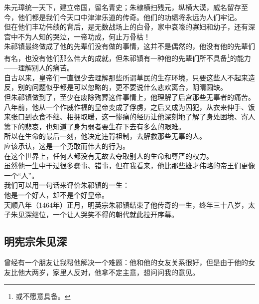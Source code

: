 \begin{multicols}{\theparacolNo}
朱元璋统一天下，建立帝国，留名青史；朱棣横扫残元，纵横大漠，威名留存至今，他们都是我们今天口中津津乐道的传奇。他们的功绩将永远为人们牢记。\\

但在他们丰功伟绩的背后，是无数战场上的白骨，家中哀嚎的寡妇和幼子，还有深宫中不为人知的哭泣，一帝功成，何止万骨枯！\\

朱祁镇最终做成了他的先辈们没有做的事情，这并不是偶然的，他没有他的先辈们有名，也没有他们那么伟大的成就，但朱祁镇有一种他的先辈们所不具备\footnote{或不愿意具备。}的能力——理解别人的痛苦。\\

自古以来，皇帝们一直很少去理解那些所谓草民的生存环境，只要这些人不起来造反，别的问题似乎都是可以忽略的，更不要说什么悲欢离合，阴晴圆缺。\\

但朱祁镇做到了，至少在废除殉葬这件事情上，他理解了后宫那些无辜者的痛苦。八年前，他从一个作威作福的皇帝变成了俘虏，之后又成为囚犯，从衣来伸手、饭来张口到衣食不继、相拥取暖，这一惨痛的经历让他深刻地了解了身处困境、寄人篱下的悲哀，也知道了身为弱者要生存下去有多么的艰难。\\

所以在生命的最后一刻，他决定违背祖制，去解救那些无辜的人。\\

应该承认，这是一个勇敢而伟大的行为。\\

在这个世界上，任何人都没有无故去夺取别人的生命和尊严的权力。\\

虽然他一生中干过很多蠢事、错事，但在我看来，他比那些雄才伟略的帝王们更像一个“人”。\\

我们可以用一句话来评价朱祁镇的一生：\\

他是一个好人，却不是个好皇帝。\\

天顺八年（1464年）正月，明英宗朱祁镇结束了他传奇的一生，终年三十八岁，太子朱见深继位，一个让人哭笑不得的朝代就此拉开序幕。\\

\subsection{明宪宗朱见深}
曾经有一个朋友让我帮他解决一个难题：他和他的女友关系很好，但是由于他的女友比他大两岁，家里人反对，他拿不定主意，想问问我的意见。\\


\end{multicols}
